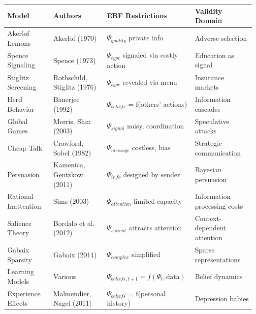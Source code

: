 \small
\begin{longtable}{@{}p{3cm}p{2.5cm}p{4cm}p{4cm}@{}}
\toprule
\textbf{Model} & \textbf{Authors} & \textbf{EBF Restrictions} & \textbf{Validity Domain} \\
\midrule
\endhead

Akerlof Lemons & Akerlof (1970) &
$\Psi_{quality}$ private info &
Adverse selection \\

Spence Signaling & Spence (1973) &
$\Psi_{type}$ signaled via costly action &
Education as signal \\

Stiglitz Screening & Rothschild, Stiglitz (1976) &
$\Psi_{type}$ revealed via menu &
Insurance markets \\

Herd Behavior & Banerjee (1992) &
$\Psi_{beliefs}$ = f(others' actions) &
Information cascades \\

Global Games & Morris, Shin (2003) &
$\Psi_{signal}$ noisy, coordination &
Speculative attacks \\

Cheap Talk & Crawford, Sobel (1982) &
$\Psi_{message}$ costless, bias &
Strategic communication \\

Persuasion & Kamenica, Gentzkow (2011) &
$\Psi_{info}$ designed by sender &
Bayesian persuasion \\

Rational Inattention & Sims (2003) &
$\Psi_{attention}$ limited capacity &
Information processing costs \\

Salience Theory & Bordalo et al. (2012) &
$\Psi_{salient}$ attracts attention &
Context-dependent attention \\

Gabaix Sparsity & Gabaix (2014) &
$\Psi_{complex}$ simplified &
Sparse representations \\

Learning Models & Various &
$\Psi_{beliefs,t+1} = f(\Psi_t, \text{data})$ &
Belief dynamics \\

Experience Effects & Malmendier, Nagel (2011) &
$\Psi_{beliefs}$ = f(personal history) &
Depression babies \\

\bottomrule
\end{longtable}
\normalsize

